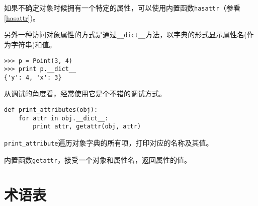 

如果不确定对象时候拥有一个特定的属性，可以使用内置函数{\tt hasattr}（参看\ref{hasattr})。


另外一种访问对象属性的方式是通过\verb"__dict__"方法，以字典的形式显示属性名(作为字符串)和值。

\beforeverb
\begin{verbatim}
>>> p = Point(3, 4)
>>> print p.__dict__
{'y': 4, 'x': 3}
\end{verbatim}
\afterverb
%

从调试的角度看，经常使用它是个不错的调试方式。

\beforeverb
\begin{verbatim}
def print_attributes(obj):
    for attr in obj.__dict__:
        print attr, getattr(obj, attr)
\end{verbatim}
\afterverb

\verb"print_attribute"遍历对象字典的所有项，打印对应的名称及其值。


内置函数{\tt getattr}，接受一个对象和属性名，返回属性的值。


\section{术语表}

